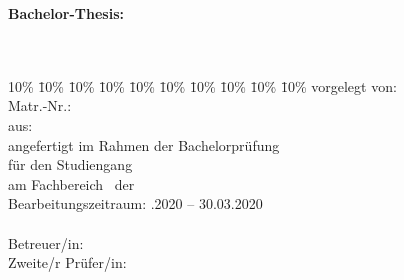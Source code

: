 \begin{titlepage}
  \begin{center}
  \textbf{Bachelor-Thesis:}\\
  \Huge{\myTitel}\\
  \LARGE{\mySubtitel}\\
  \vspace{0.2cm}
  \end{center}
  \normalsize
  \vfill
  \begin{tabbing}
    10\% \= 10\% \= 10\% \= 10\% \= 10\% \= 10\% \= 10\% \= 10\% \= 10\% \= 10\%\kill
    vorgelegt von: \> \> \> \> \> \> \> \> \> \myAutor\\
    Matr.-Nr.: \> \> \> \> \> \> \> \> \> \myMatrikelNr\\
    aus: \> \> \> \> \> \> \> \> \> \myLocation\\
    angefertigt im Rahmen der Bachelorprüfung\\%
    für den Studiengang \myStudiengang \\%
    am Fachbereich \myFachbereich\ der \myHochschulName \\
    Bearbeitungszeitraum: \> \> \> \> \> \> \> \> .2020 -- 30.03.2020 \\
    \\
    Betreuer/in: \> \> \> \> \> \> \> \> \> \myBetreuer\\
    Zweite/r Prüfer/in: \> \> \> \> \> \> \> \> \> \myZweitpruefer\\
  \end{tabbing}
\end{titlepage}
